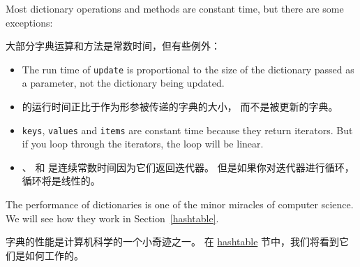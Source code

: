 Most dictionary operations and methods are constant time, but
there are some exceptions:

大部分字典运算和方法是常数时间，但有些例外：

\begin{itemize}

\item The run time of {\tt update} is
  proportional to the size of the dictionary passed as a parameter,
  not the dictionary being updated.

\item {} 的运行时间正比于作为形参被传递的字典的大小，
   而不是被更新的字典。

\item {\tt keys}, {\tt values} and {\tt items} are constant time because
  they return iterators.  But if you loop through the iterators, the loop will be linear.

\item {}、  和  是连续常数时间因为它们返回迭代器。
   但是如果你对迭代器进行循环，循环将是线性的。

\end{itemize}

The performance of dictionaries is one of the minor miracles of
computer science.  We will see how they work in
Section~\ref{hashtable}.

字典的性能是计算机科学的一个小奇迹之一。
在 \hyperref[hashtable]{hashtable} 节中，我们将看到它们是如何工作的。

